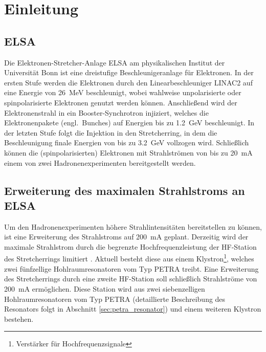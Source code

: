\chapter{Einleitung}
\label{sec:einleitung}

\section{ELSA}
Die Elektronen-Stretcher-Anlage ELSA am physikalischen Institut der Universität Bonn ist eine dreistufige Beschleunigeranlage für Elektronen.
In der ersten Stufe werden die Elektronen durch den Linearbeschleuniger LINAC2 auf eine Energie von \SI{26}{MeV} beschleunigt, wobei wahlweise unpolarisierte oder spinpolarisierte Elektronen genutzt werden können.
Anschließend wird der Elektronenstrahl in ein Booster-Synchrotron injiziert, welches die Elektronenpakete (engl.\ Bunches) auf Energien bis zu \SI{1.2}{GeV} beschleunigt.
In der letzten Stufe folgt die Injektion in den Stretcherring, in dem die Beschleunigung finale Energien von bis zu \SI{3.2}{GeV} vollzogen wird.
Schließlich können die (spinpolarisierten) Elektronen mit Strahlströmen von bis zu \SI{20}{mA} einem von zwei Hadronenexperimenten bereitgestellt werden.


\section{Erweiterung des maximalen Strahlstroms an ELSA}
Um den Hadronenexperimenten höhere Strahlintensitäten bereitstellen zu können, ist eine Erweiterung des Strahlstroms auf \SI{200}{mA} geplant.
Derzeitig wird der maximale Strahlstrom durch die begrenzte Hochfrequenzleistung der HF-Station des Stretcherrings limitiert \cite{schedler}.
Aktuell besteht diese aus einem Klystron\footnote{Verstärker für Hochfrequenzsignale}, welches zwei fünfzellige Hohlraumresonatoren vom Typ PETRA treibt.
Eine Erweiterung des Stretcherrings durch eine zweite HF-Station soll schließlich Strahlströme von \SI{200}{mA} ermöglichen.
Diese Station wird aus zwei siebenzelligen Hohlraumresonatoren vom Typ PETRA (detaillierte Beschreibung des Resonators folgt in Abschnitt \ref{sec:petra_resonator}) und einem weiteren Klystron bestehen.

